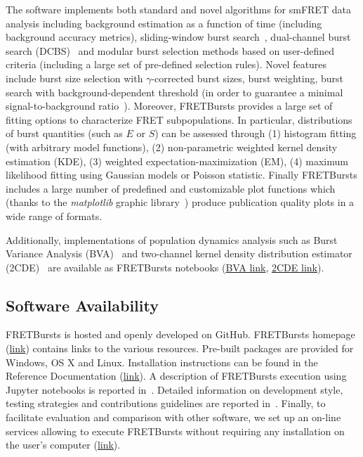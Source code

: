 \documentclass[10pt,letterpaper]{article}
\begin{document}
The software implements both standard and novel algorithms for smFRET data analysis
including background estimation as a function of time (including background accuracy
metrics), sliding-window burst search~\cite{Eggeling_1998},
dual-channel burst search (DCBS)~\cite{Nir_2006} and
modular burst selection methods based on user-defined criteria
(including a large set of pre-defined selection rules). Novel features include burst size
selection with $\gamma$-corrected burst sizes, burst weighting, burst search with
background-dependent threshold (in order to guarantee a minimal signal-to-background
ratio~\cite{Michalet_2012}).
Moreover, FRETBursts provides a large set of fitting options to characterize FRET subpopulations.
In particular, distributions of burst quantities (such as $E$ or $S$) can be assessed
through (1) histogram fitting (with arbitrary model functions),
(2) non-parametric weighted kernel density estimation (KDE), (3) weighted
expectation-maximization (EM), (4) maximum likelihood fitting using Gaussian models
or Poisson statistic. Finally FRETBursts includes a large number of
predefined and customizable plot functions which (thanks to the \textit{matplotlib}
graphic library~\cite{matplotlib}) produce publication quality plots in a wide range of formats.

Additionally, implementations of population dynamics analysis such
as Burst Variance Analysis (BVA)~\cite{Torella_2011} and two-channel
kernel density distribution estimator (2CDE)~\cite{Tomov_2012}
are available as FRETBursts notebooks
(\href{http://nbviewer.jupyter.org/github/tritemio/FRETBursts_notebooks/blob/master/notebooks/Example%20-%20Burst%20Variance%20Analysis.ipynb}{BVA link},
\href{http://nbviewer.jupyter.org/github/tritemio/FRETBursts_notebooks/blob/master/notebooks/Example%20-%202CDE%20Method.ipynb}{2CDE link}).

\subsection*{Software Availability}
FRETBursts is hosted and openly developed on GitHub. FRETBursts homepage
(\href{http://tritemio.github.io/FRETBursts}{link})
contains links to the various resources. Pre-built packages are provided for
Windows, OS X and Linux. Installation instructions
can be found in the Reference Documentation
(\href{http://fretbursts.readthedocs.org/en/latest/getting_started.html}{link}).
A description of FRETBursts execution using Jupyter notebooks is reported
in~. %
Detailed information on development style, testing strategies and
contributions guidelines are reported in~. %
Finally, to facilitate evaluation and comparison with other software,
we set up an on-line services allowing to execute FRETBursts
without requiring any installation on the user's computer (\href{https://github.com/tritemio/FRETBursts_notebooks#run-online}{link}).
\end{document}
